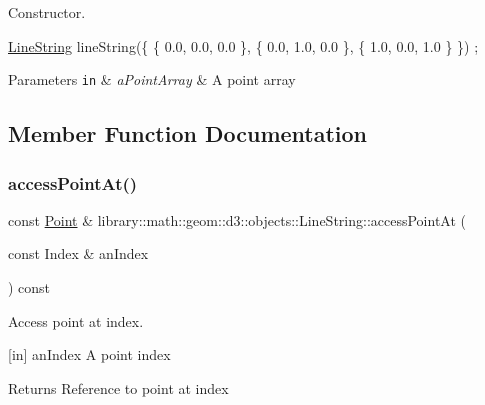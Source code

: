 Constructor. 


\begin{DoxyCode}
\hyperlink{classlibrary_1_1math_1_1geom_1_1d3_1_1objects_1_1_line_string_aab80e60f34f06d4ab9f84f0e59aa389e}{LineString} lineString(\{ \{ 0.0, 0.0, 0.0 \}, \{ 0.0, 1.0, 0.0 \}, \{ 1.0, 0.0, 1.0 \} \}) ;
\end{DoxyCode}



\begin{DoxyParams}[1]{Parameters}
\mbox{\tt in}  & {\em a\+Point\+Array} & A point array \\
\hline
\end{DoxyParams}


\subsection{Member Function Documentation}
\mbox{\label{classlibrary_1_1math_1_1geom_1_1d3_1_1objects_1_1_line_string_a10bafe20bf12505dfe7dfb9c83ce1613}} 
\subsubsection{\texorpdfstring{access\+Point\+At()}{accessPointAt()}}
{\footnotesize\ttfamily const \hyperlink{classlibrary_1_1math_1_1geom_1_1d3_1_1objects_1_1_point}{Point} \& library\+::math\+::geom\+::d3\+::objects\+::\+Line\+String\+::access\+Point\+At (\begin{DoxyParamCaption}\item[{const Index \&}]{an\+Index }\end{DoxyParamCaption}) const}



Access point at index. 

\mbox{[}in\mbox{]} an\+Index A point index \begin{DoxyReturn}{Returns}
Reference to point at index 
\end{DoxyReturn}
\mbox{\label{classlibrary_1_1math_1_1geom_1_1d3_1_1objects_1_1_line_string_a8a20f45b2af9cc45dbf7aff9e5d4824e}} 
